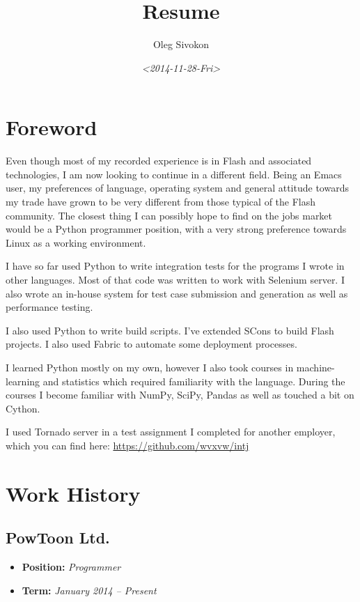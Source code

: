 \documentclass[11pt]{article}
\author{Oleg Sivokon}
\date{\textit{<2014-11-28-Fri>}}
\title{Resume}
\begin{document}
\maketitle

\clearpage
\thispagestyle{plain}
\clearpage

\section{Foreword}
\label{sec-1}
Even though most of my recorded experience is in Flash and associated
technologies, I am now looking to continue in a different field.  Being an
Emacs user, my preferences of language, operating system and general attitude
towards my trade have grown to be very different from those typical of the
Flash community.  The closest thing I can possibly hope to find on the jobs
market would be a Python programmer position, with a very strong preference
towards Linux as a working environment.

I have so far used Python to write integration tests for the programs I
wrote in other languages.  Most of that code was written to work with Selenium
server.  I also wrote an in-house system for test case submission and generation
as well as performance testing.

I also used Python to write build scripts.  I've extended SCons to build Flash
projects.  I also used Fabric to automate some deployment processes.

I learned Python mostly on my own, however I also took courses in
machine-learning and statistics which required familiarity with the language.
During the courses I become familiar with NumPy, SciPy, Pandas as well as
touched a bit on Cython.

I used Tornado server in a test assignment I completed for another employer,
which you can find here: \url{https://github.com/wvxvw/intj}
\section{Work History}
\label{sec-2}

\subsection{PowToon Ltd.}
\label{sec-2-1}
\begin{itemize}
\item \textbf{Position:} \emph{Programmer}
\item \textbf{Term:} \emph{January 2014 – Present}
\end{itemize}
\end{document}
